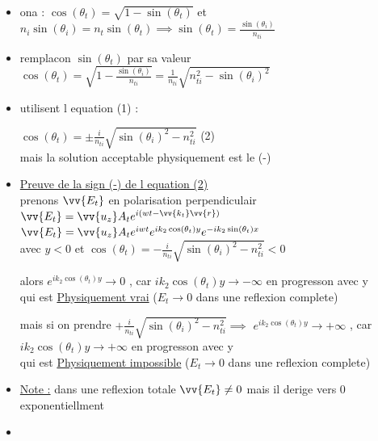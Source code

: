\documentclass[12pt]{book}
\begin{document}
                \begin{itemize}
                    \item ona : $ \cos(\theta_t) = \sqrt{1-\sin(\theta_t)} $ et $ n_i\sin(\theta_i) = n_t\sin(\theta_t) \implies \sin(\theta_t) = \frac{\sin(\theta_i)}{n_{ti}} $
                    \item remplacon $\sin(\theta_t)$ par sa valeur $\cos(\theta_t) = \sqrt{1-\frac{\sin(\theta_i)}{n_{ti}}} = \frac{1}{n_{ti}}\sqrt{n_{ti}^2 - \sin(\theta_i)^2} $
                    \item utilisent l equation (1) : \\
                        \begin{center}
                            $\cos(\theta_t) = \pm \frac{i}{n_{ti}}\sqrt{\sin(\theta_i)^2 - n_{ti}^2} $ (2)\\
                            mais la solution acceptable physiquement est le (-)
                        \end{center}
                    \item \underline{Preuve de la sign (-) de l equation (2)} \\
                        prenons $\vv{E_t}$ en polarisation perpendiculair $\vv{E_t} = \vv{u_z}A_te^{i(wt-\vv{k_t}\vv{r})}$\\
                        $\vv{E_t} = \vv{u_z}A_te^{iwt}e^{ik_2\cos(\theta_t)y}e^{-ik_2\sin(\theta_t)x}$ \\
                        avec $y < 0$ et $\cos(\theta_t) = - \frac{i}{n_{ti}}\sqrt{\sin(\theta_i)^2 - n_{ti}^2} < 0$
                        \begin{center}
                            alors $e^{ik_2\cos(\theta_t)y}\to 0$ , car $ik_2\cos(\theta_t)y \to -\infty$ en progresson avec y \\
                            qui est \underline{Physiquement vrai} ($E_t \to 0$ dans une reflexion complete)
                        \end{center}
                        mais si on prendre $+ \frac{i}{n_{ti}}\sqrt{\sin(\theta_i)^2 - n_{ti}^2} \implies$ $e^{ik_2\cos(\theta_t)y}\to +\infty$ , car $ik_2\cos(\theta_t)y \to +\infty$ en progresson avec y \\
                        qui est \underline{Physiquement impossible} ($E_t \to 0$ dans une reflexion complete)
                    \item \underline{Note :} dans une reflexion totale $\vv{E_t} \not = 0$ mais il derige vers $0$ exponentiellment
                    \item \begin{center}
                    \end{center}
                \end{itemize}
\end{document}
